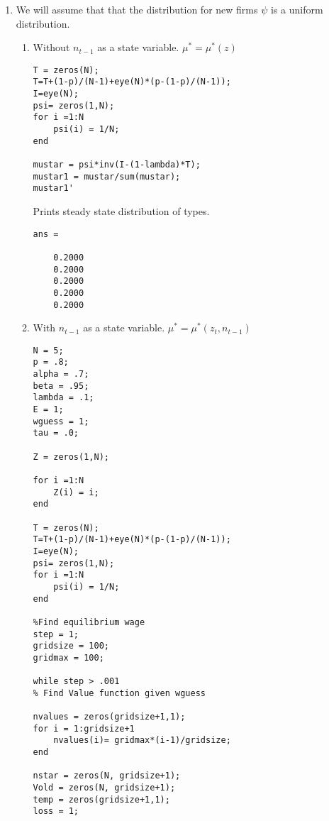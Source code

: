 \documentclass[12pt]{article}
\begin{document}
\begin{onehalfspace}
\begin{enumerate}[1.]
\begin{lstlisting}
Z = zeros(1,N);
nstar = zeros(N,1);
for i =1:N
    Z(i) = i;
    nstar(i) = (w/(Z(i)*alpha))^(1/(alpha-1));
end

nstar
    \end{lstlisting}
    Prints $n^*$:
    \begin{lstlisting}
nstar =

    0.3046
    3.0697
   11.8594
   30.9405
   65.0969
    \end{lstlisting}
    The aggregate labor input is:
    $\sum\limits_{z}\mu_t(z) n^*(z)$
    Or in matrix notation: $\mu_t n^*$ where $mu_t$ is the 1xN measure over types and $n^*$ is the the Nx1 vector of optimal employment over types.
    \item
    We will assume that that the distribution for new firms $\psi$ is a uniform distribution.
    \begin{enumerate}
        \item Without $n_{t-1}$ as a state variable. $\mu^*=\mu^*(z)$
        \begin{lstlisting}
T = zeros(N);
T=T+(1-p)/(N-1)+eye(N)*(p-(1-p)/(N-1));
I=eye(N);
psi= zeros(1,N);
for i =1:N
    psi(i) = 1/N;
end

mustar = psi*inv(I-(1-lambda)*T);
mustar1 = mustar/sum(mustar);
mustar1'
    \end{lstlisting}
Prints steady state distribution of types.
\begin{lstlisting}
ans =

    0.2000
    0.2000
    0.2000
    0.2000
    0.2000
\end{lstlisting}
        \item With $n_{t-1}$ as a state variable. $\mu^*=\mu^*(z_t, n_{t-1})$
        \begin{lstlisting}
N = 5;
p = .8;
alpha = .7;
beta = .95;
lambda = .1;
E = 1;
wguess = 1;
tau = .0;

Z = zeros(1,N);

for i =1:N
    Z(i) = i;
end

T = zeros(N);
T=T+(1-p)/(N-1)+eye(N)*(p-(1-p)/(N-1));
I=eye(N);
psi= zeros(1,N);
for i =1:N
    psi(i) = 1/N;
end

%Find equilibrium wage
step = 1;
gridsize = 100;
gridmax = 100;

while step > .001
% Find Value function given wguess

nvalues = zeros(gridsize+1,1);
for i = 1:gridsize+1
    nvalues(i)= gridmax*(i-1)/gridsize; 
end

nstar = zeros(N, gridsize+1);
Vold = zeros(N, gridsize+1);
temp = zeros(gridsize+1,1);
loss = 1;


\end{lstlisting}
\end{enumerate}
\end{enumerate}
\end{onehalfspace}
\end{document}
